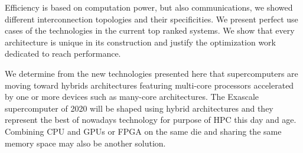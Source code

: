 Efficiency is based on computation power, but also communications, we showed different interconnection topologies and their specificities. 
We present perfect use cases of the technologies in the current top ranked systems.
We show that every architecture is unique in its construction and justify the optimization work dedicated to reach performance. 

We determine from the new technologies presented here that supercomputers are moving toward hybrids architectures featuring multi-core processors accelerated by one or more devices such as many-core architectures. 
The Exascale supercomputer of 2020 will be shaped using hybrid architectures and they represent the best of nowadays technology for purpose of HPC this day and age. 
Combining CPU and GPUs or FPGA on the same die and sharing the same memory space may also be another solution.
